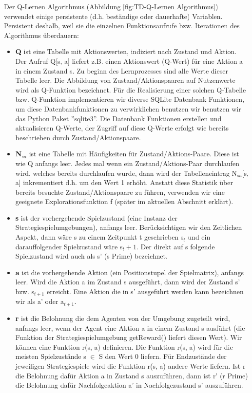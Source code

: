 Der Q-Lernen Algorithmus (Abbildung \ref{fig:TD-Q-Lernen Algorithmus}) verwendet einige persistente (d.h. beständige oder dauerhafte) Variablen. Persistent deshalb, weil sie die einzelnen Funktionsaufrufe bzw. Iterationen des Algorithmus überdauern:
 
\begin{itemize}
\item \textbf{Q} ist eine Tabelle mit Aktionswerten, indiziert nach Zustand und Aktion. Der Aufruf Q[s, a] liefert z.B. einen Aktionswert (Q-Wert) für eine Aktion a in einem Zustand s. Zu beginn des Lernprozesses sind alle Werte dieser Tabelle leer. Die Abbildung von Zustand/Aktionspaaren auf Nutzenwerte wird als Q-Funktion bezeichnet. Für die Realisierung einer solchen Q-Tabelle bzw. Q-Funktion implementieren wir diverse SQLite Datenbank Funktionen, um diese Datenbankfunktionen zu verwirklichen benutzen wir benutzen wir das Python Paket ''sqlite3''. Die Datenbank Funktionen erstellen und aktualisieren Q-Werte, der Zugriff auf diese Q-Werte erfolgt wie bereits beschrieben durch Zustand/Aktionspaare.

\item \textbf{N$_{sa}$} ist eine Tabelle mit Häufigkeiten für Zustand/Aktions-Paare.  Diese ist wie Q anfangs leer. Jedes mal wenn ein Zustand/Aktions-Paar durchlaufen wird, welches bereits durchlaufen wurde, dann wird der Tabelleneintrag N$_{sa}$[s, a] inkrementiert d.h. um den Wert 1 erhöht. Anstatt diese Statistik über bereits besuchte Zustand/Aktionspaare zu führen, verwenden wir eine geeignete Explorationsfunktion f (später im aktuellen Abschnitt erklärt).

\item \textbf{s} ist der vorhergehende Spielzustand (eine Instanz der Strategiespielumgebungen), anfangs leer. Berücksichtigen wir den Zeitlichen Aspekt, dann wäre s zu einem Zeitpunkt t geschrieben s${_t}$ und ein darauffolgender Spielzustand wäre s${_t+1}$. Der direkt auf s folgende Spielzustand wird auch als s' (s Prime) bezeichnet.

\item \textbf{a} ist die vorhergehende Aktion (ein Positionstupel der Spielmatrix), anfangs leer. Wird die Aktion a im Zustand s ausgeführt, dann wird der Zustand s' bzw. s$_{t+1}$ erreicht. Eine Aktion die in s' ausgeführt werden kann bezeichnen wir als a' oder a$_{t+1}$.

\item \textbf{r} ist die Belohnung die dem Agenten von der Umgebung zugeteilt wird, anfangs leer, wenn der Agent eine Aktion a in einem Zustand s ausführt (die Funktion der Strategiespielumgebung getReward() liefert diesen Wert). Wir können eine Funktion r(s, a) definieren. Die Funktion r(s, a) wird für die meisten Spielzustände s $\in$ S den Wert 0 liefern. Für Endzustände der jeweiligen Strategiespiele wird die Funktion r(s, a) andere Werte liefern. Ist r die Belohnung dafür Aktion a in Zustand s auszuführen, dann ist r' (r Prime) die Belohnung dafür Nachfolgeaktion a' in Nachfolgezustand s' auszuführen.
\end{itemize}

